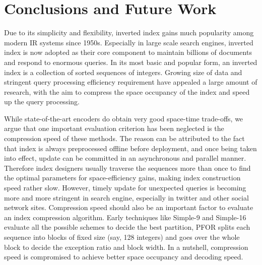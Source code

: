 \documentclass[runningheads,a4paper]{llncs}
\begin{document}
\section{Conclusions and Future Work}

Due to its simplicity and flexibility, inverted index gains much popularity among modern IR systems since 1950s. Especially in large scale search engines, inverted index is now adopted as their core component to maintain billions of documents and respond to enormous queries. In its most basic and popular form, an inverted index is a collection of sorted sequences of integers\cite{manning2008introduction,witten1999managing,zobel2006inverted}. Growing size of data and stringent query processing efficiency requirement have appealed a large amount of research, with the aim to compress the space occupancy of the index and speed up the query processing.

While state-of-the-art encoders do obtain very good space-time trade-offs, we argue that one important evaluation criterion has been neglected is the compression speed of these methods\cite{manning2008introduction,silvestri2010vsencoding,yan2009inverted}. The reason can be attributed to the fact that index is always preprocessed offline before deployment, and once being taken into effect, update can be committed in an asynchronous and parallel manner. Therefore index designers usually traverse the sequences more than once to find the optimal parameters for space-efficiency gains, making index construction speed rather slow. However, timely update for unexpected queries is becoming more and more stringent in search engine, especially in twitter and other social network sites. Compression speed should also be an important factor to evaluate an index compression algorithm. Early techniques like Simple-9 and Simple-16\cite{anh2005inverted,anh2010index} evaluate all the possible schemes to decide the best partition, PFOR\cite{lemire2015decoding,yan2009inverted,zobel2006inverted} splits each sequence into blocks of fixed size (say, 128 integers) and goes over the whole block to decide the exception ratio and block width. In a nutshell, compression speed is compromised to achieve better space occupancy and decoding speed.
\end{document}
